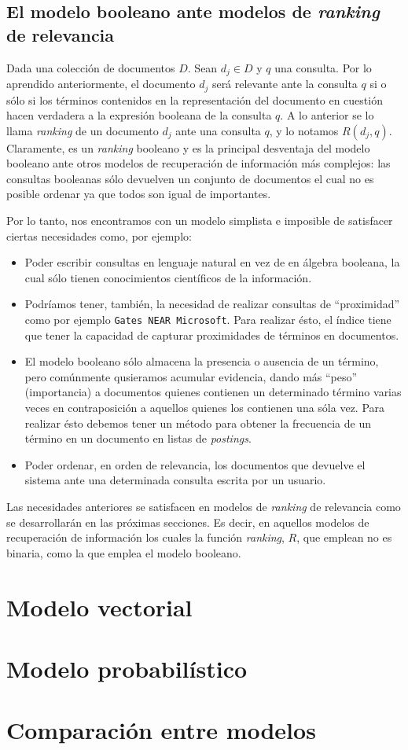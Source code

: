 		\subsection{El modelo booleano ante modelos de \textit{ranking} de relevancia}
			Dada una colección de documentos $D$. Sean $d_j \in D$ y $q$ una consulta. Por lo aprendido anteriormente, el documento $d_j$ será relevante ante la consulta $q$ si o sólo si los términos contenidos en la representación del documento en cuestión hacen verdadera a la expresión booleana de la consulta $q$. A lo anterior se lo llama \textit{ranking} de un documento $d_j$ ante una consulta $q$, y lo notamos $R(d_j,q)$. Claramente, es un \textit{ranking} booleano y es la principal desventaja del modelo booleano ante otros modelos de recuperación de información más complejos: las consultas booleanas sólo devuelven un conjunto de documentos el cual no es posible ordenar ya que todos son igual de importantes. \par
			
			Por lo tanto, nos encontramos con un modelo simplista e imposible de satisfacer ciertas necesidades como, por ejemplo:
			\begin{itemize}
				\item Poder escribir consultas en lenguaje natural en vez de en álgebra booleana, la cual sólo tienen conocimientos científicos de la información.
				\item Podríamos tener, también, la necesidad de realizar consultas de \enquote{proximidad} como por ejemplo \texttt{Gates NEAR Microsoft}. Para realizar ésto, el índice tiene que tener la capacidad de capturar proximidades de términos en documentos.
				\item El modelo booleano sólo almacena la presencia o ausencia de un término, pero comúnmente qusieramos acumular evidencia, dando más \enquote{peso} (importancia) a documentos quienes contienen un determinado término varias veces en contraposición a aquellos quienes los contienen una sóla vez. Para realizar ésto debemos tener un método para obtener la frecuencia de un término en un documento en listas de \textit{postings}.
				\item Poder ordenar, en orden de relevancia, los documentos que devuelve el sistema ante una determinada consulta escrita por un usuario.
			\end{itemize}
			
			Las necesidades anteriores se satisfacen en modelos de \textit{ranking} de relevancia como se desarrollarán en las próximas secciones. Es decir, en aquellos modelos de recuperación de información los cuales la función \textit{ranking}, $R$, que emplean no es binaria, como la que emplea el modelo booleano.

\section{Modelo vectorial}

\section{Modelo probabilístico}

\section{Comparación entre modelos}
